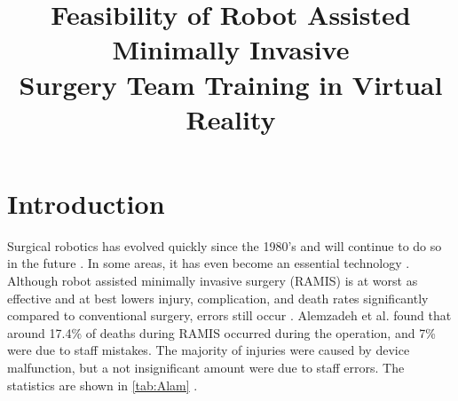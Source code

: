 \documentclass[conference]{IEEEtran}
\begin{document}
\title{Feasibility of Robot Assisted Minimally Invasive \\ Surgery Team Training in Virtual Reality}


\author{
}
\maketitle
\thispagestyle{fancy}

\begin{abstract}


\end{abstract}





%
\IEEEpeerreviewmaketitle



\section{Introduction}

Surgical robotics has evolved quickly since the 1980's and will continue to do so in the future \citep{taylor_medical_2008}. In some areas, it has even become an essential technology \citep{sivaraman_robotics_2015}. Although robot assisted minimally invasive surgery (RAMIS) is at worst as effective and at best lowers injury, complication, and death rates significantly compared to conventional surgery, errors still occur \citep{razmaria_does_2014, punnen_how_2013, sung_oncologic_2016,raza_long-term_2015}. Alemzadeh et al. found that around 17.4\% of deaths during RAMIS occurred during the operation, and 7\% were due to staff mistakes. The majority of injuries were caused by device malfunction, but a not insignificant amount were due to staff errors. The statistics are shown in \autoref{tab:Alam} \citep{alemzadeh_adverse_2016}.
\end{document}
